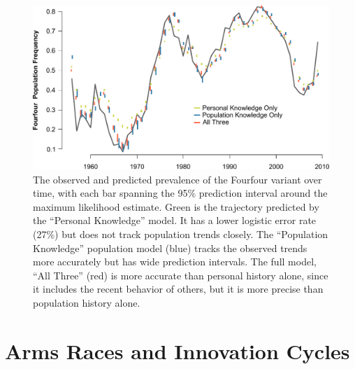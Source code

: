 

\begin{figure}[t]
\begin{center} 
\includegraphics[scale=0.7]{figures/gofirstmove/figFourfourPredicted.pdf}
\caption{The observed and predicted prevalence of the Fourfour variant over time, with each bar spanning the 95\% prediction interval around the maximum likelihood estimate.  Green is the trajectory predicted by the ``Personal Knowledge'' model.  It has a lower logistic error rate (27\%) but does not track population trends closely.  The ``Population Knowledge'' population model (blue) tracks the observed trends more accurately but has wide prediction intervals.  The full model, ``All Three'' (red) is more accurate than personal history alone, since it includes the recent behavior of others, but it is more precise than population history alone.}
\label{fig:FourfourPredicted}	
\end{center}
\end{figure}



\section{Arms Races and Innovation Cycles} \label{sec:Arms}

 
